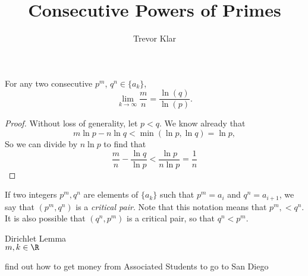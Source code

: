 \documentclass[a5paper]{article}
\title{Consecutive Powers of Primes}
\author{Trevor Klar}
\begin{document}
\maketitle

\begin{lemma}For any two consecutive $p^m$, $q^n \in \{a_k\}$, 
$$\lim_{k \to \infty} \frac{m}{n} = \frac{\ln(q)}{\ln(p)}.$$
\begin{proof}
Without loss of generality, let $p<q$. We know already that 
$$m\ln{p}-n\ln{q} < \min(\ln{p}, \ln{q}) = \ln{p},$$
So we can divide by $n\ln{p}$ to find that 
$$\frac{m}{n}-\frac{\ln{q}}{\ln{p}} < \frac{\ln{p}}{n\ln{p}} = \frac{1}{n}$$

\end{proof}

\end{lemma}

\begin{definition*}
If two integers $p^m, q^n$ are elements of $\{a_k\}$ such that $p^m=a_i$ and $q^n=a_{i+1}$, we say that $(p^m, q^n)$ is a \emph{critical pair}. Note that this notation means that $p^m,<q^n$. It is also possible that $(q^n, p^m)$ is a critical pair, so that $q^n < p^m$.
\end{definition*}

\begin{lemma*}Dirichlet Lemma\\

$m,k \in \R$

find out how to get money from Associated Students to go to San Diego

\end{lemma*}
\end{document}
